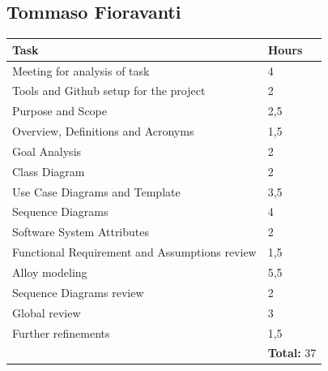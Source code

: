 \documentclass{report}
\begin{document}
\begin{table}[!ht]
	\subsection*{Tommaso Fioravanti}
	\begin{tabular}{|C{.60\textwidth}||C{.20\textwidth}|}
		\toprule
		\textbf{Task} & \textbf{Hours}\\
		\midrule
		\midrule
		Meeting for analysis of task & 4\\
		\midrule
		Tools and Github setup for the project & 2\\
		\midrule
		Purpose and Scope & 2,5\\
		\midrule
		Overview, Definitions and Acronyms & 1,5\\
		\midrule
		Goal Analysis & 2\\
		\midrule
		Class Diagram & 2\\
		\midrule
		Use Case Diagrams and Template & 3,5\\
		\midrule
		Sequence Diagrams & 4\\
		\midrule
		Software System Attributes & 2 \\
		\midrule
		Functional Requirement and Assumptions review &1,5\\
		\midrule
		Alloy modeling& 5,5\\
		\midrule
		Sequence Diagrams review & 2\\
		\midrule
		Global review & 3\\
		\midrule
		Further refinements& 1,5\\ 
		\midrule
		& \textbf{Total:} 37\\
		\bottomrule
	\end{tabular}
\end{table}
\end{document}
